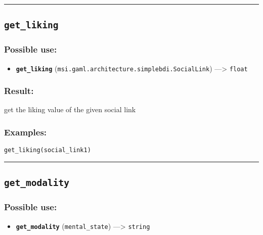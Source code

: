 \documentclass[]{book}
\providecommand{\tightlist}{%
  \setlength{\itemsep}{0pt}\setlength{\parskip}{0pt}}
\theoremstyle{definition}
\theoremstyle{definition}
\theoremstyle{definition}
\theoremstyle{remark}
\begin{document}
\begin{center}\rule{0.5\linewidth}{\linethickness}\end{center}

\subsection{\texorpdfstring{\texttt{get\_liking}}{get\_liking}}\label{get_liking}

\subsubsection{Possible use:}\label{possible-use-219}

\begin{itemize}
\tightlist
\item
  \textbf{\texttt{get\_liking}}
  (\texttt{msi.gaml.architecture.simplebdi.SocialLink})
  ---\textgreater{} \texttt{float}
\end{itemize}

\subsubsection{Result:}\label{result-213}

get the liking value of the given social link

\subsubsection{Examples:}\label{examples-166}

\begin{verbatim}
get_liking(social_link1) 
\end{verbatim}

\begin{center}\rule{0.5\linewidth}{\linethickness}\end{center}

\subsection{\texorpdfstring{\texttt{get\_modality}}{get\_modality}}\label{get_modality}

\subsubsection{Possible use:}\label{possible-use-220}

\begin{itemize}
\tightlist
\item
  \textbf{\texttt{get\_modality}} (\texttt{mental\_state})
  ---\textgreater{} \texttt{string}
\end{itemize}
\end{document}
